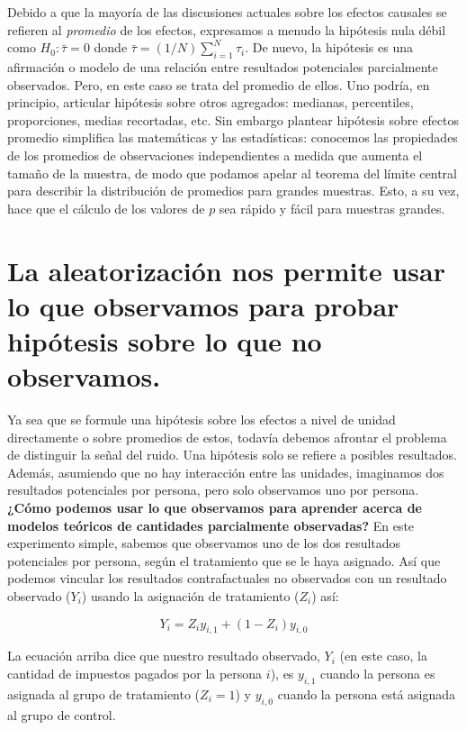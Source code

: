 \documentclass[
]{article}
\begin{document}
Debido a que la mayoría de las discusiones actuales sobre los efectos causales se refieren al \emph{promedio} de los efectos, expresamos a menudo la hipótesis nula débil como \(H_0: \bar {\tau} = 0\) donde \(\bar{\tau} = (1/N) \sum_{i = 1}^N \tau_i\). De nuevo, la hipótesis es una afirmación o modelo de una relación entre resultados potenciales parcialmente observados. Pero, en este caso se trata del promedio de ellos. Uno podría, en principio, articular hipótesis sobre otros agregados: medianas, percentiles, proporciones, medias recortadas, etc. Sin embargo plantear hipótesis sobre efectos promedio simplifica las matemáticas y las estadísticas: conocemos las propiedades de los promedios de observaciones independientes a medida que aumenta el tamaño de la muestra, de modo que podamos apelar al teorema del límite central para describir la distribución de promedios para grandes muestras. Esto, a su vez, hace que el cálculo de los valores de \(p\) sea rápido y fácil para muestras grandes.

\hypertarget{la-aleatorizaciuxf3n-nos-permite-usar-lo-que-observamos-para-probar-hipuxf3tesis-sobre-lo-que-no-observamos.}{%
\section{La aleatorización nos permite usar lo que observamos para probar hipótesis sobre lo que no observamos.}\label{la-aleatorizaciuxf3n-nos-permite-usar-lo-que-observamos-para-probar-hipuxf3tesis-sobre-lo-que-no-observamos.}}

Ya sea que se formule una hipótesis sobre los efectos a nivel de unidad directamente o sobre promedios de estos, todavía debemos afrontar el problema de distinguir la señal del ruido. Una hipótesis solo se refiere a posibles resultados. Además, asumiendo que no hay interacción entre las unidades, imaginamos dos resultados potenciales por persona, pero solo observamos uno por persona. \textbf{¿Cómo podemos usar lo que observamos para aprender acerca de modelos teóricos de cantidades parcialmente observadas?} En este experimento simple, sabemos que observamos uno de los dos resultados potenciales por persona, según el tratamiento que se le haya asignado. Así que podemos vincular los resultados contrafactuales no observados con un resultado observado (\(Y_i\)) usando la asignación de tratamiento (\(Z_i\)) así:

\[Y_i = Z_i y_ {i, 1} + (1 - Z_i) y_ {i, 0}\]

La ecuación arriba dice que nuestro resultado observado, \(Y_i\) (en este caso, la cantidad de impuestos pagados por la persona \(i\)), es \(y_{i, 1}\) cuando la persona es asignada al grupo de tratamiento (\(Z_i = 1\)) y \(y_ {i, 0}\) cuando la persona está asignada al grupo de control.
\end{document}
